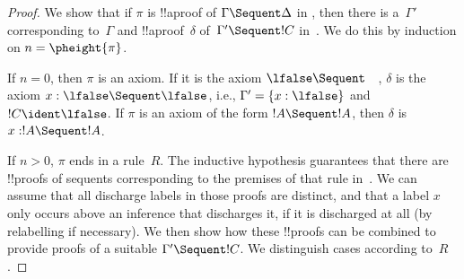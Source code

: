 \documentclass[../../../include/open-logic-section]{subfiles}
\begin{document}
\begin{proof}
  We show that if $\pi$ is !!a{proof} of $\Gamma \Sequent \Delta$ in
  , then there is a~$\Gamma'$ corresponding to~$\Gamma$ and
  !!a{proof}~$\delta$ of~$\Gamma' \Sequent !C$ in~. We do
  this by induction on $n = \pheight{\pi}$.

  If $n = 0$, then $\pi$ is an axiom. If it is the axiom $\lfalse \Sequent
  \quad$, $\delta$ is the axiom $x:\lfalse \Sequent \lfalse$, i.e.,
  $\Gamma' = \{x:\lfalse\}$ and $!C \ident \lfalse$. If $\pi$ is an
  axiom of the form $!A \Sequent !A$, then $\delta$ is $x: !A \Sequent !A$.
  
  If $n>0$, $\pi$ ends in a rule~$R$. The inductive hypothesis
  guarantees that there are !!{proof}s of sequents corresponding to
  the premises of that rule in~. We can assume that all
  discharge labels in those proofs are distinct, and that a label $x$
  only occurs above an inference that discharges it, if it is
  discharged at all (by relabelling if necessary). We then show how
  these !!{proof}s can be combined to provide proofs of a suitable
  $\Gamma' \Sequent !C$. We distinguish cases according to~$R$.


\end{proof}
\end{document}
